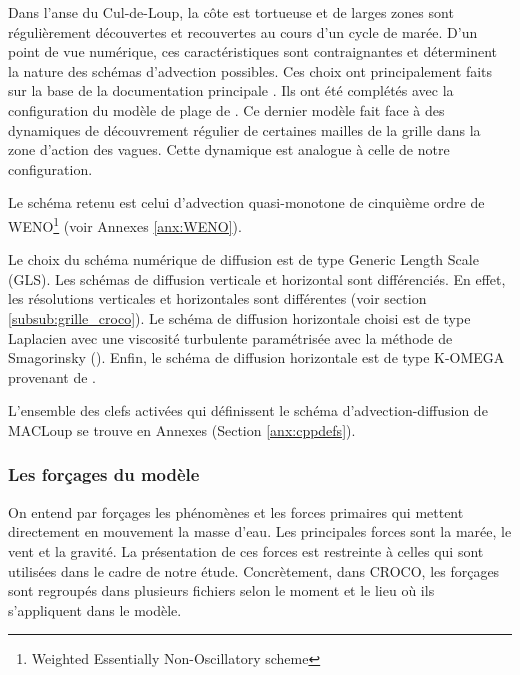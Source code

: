 \documentclass[10pt,a4paper,titlepage]{article}
\begin{document}
    Dans l'anse du Cul-de-Loup, la côte est tortueuse et de larges zones sont régulièrement découvertes et recouvertes au cours d'un cycle de marée.
    D'un point de vue numérique, ces caractéristiques sont contraignantes et déterminent la nature des schémas d'advection possibles.
    Ces choix ont principalement faits sur la base de la documentation principale \parencite{cppkeys_description}.
    Ils ont été complétés avec la configuration du modèle de plage de  \cite{swash_article_MARCHESIELLO2021101816}.
    Ce dernier modèle fait face à des dynamiques de découvrement régulier de certaines mailles de la grille dans la zone d'action des vagues.
    Cette dynamique est analogue à celle de notre configuration.
    
    Le schéma retenu est celui d'advection quasi-monotone de cinquième ordre de WENO\footnote{Weighted Essentially Non-Oscillatory scheme} (voir Annexes \ref{anx:WENO}).
    
    Le choix du schéma numérique de diffusion est de type Generic Length Scale (GLS).
    Les schémas de diffusion verticale et horizontal sont différenciés.
    En effet, les résolutions verticales et horizontales sont différentes (voir section \ref{subsub:grille_croco}).
    Le schéma de diffusion horizontale choisi est de type Laplacien avec une viscosité turbulente paramétrisée avec la méthode de Smagorinsky (\cite{schemas_diffusion_horizontale}).
    Enfin, le schéma de diffusion horizontale est de type K-OMEGA provenant de \cite{GLS_KOMEGA_kolmogorov1941equations}.
    
    L'ensemble des clefs activées qui définissent le schéma d'advection-diffusion de MACLoup se trouve en Annexes (Section \ref{anx:cppdefs}).
    
    
    \subsubsection{Les forçages du modèle}
    \label{subsub:forcages}
    On entend par forçages les phénomènes et les forces primaires qui mettent directement en mouvement la masse d'eau.
    Les principales forces sont la marée, le vent et la gravité.
    La présentation de ces forces est restreinte à celles qui sont utilisées dans le cadre de notre étude.
    Concrètement, dans CROCO, les forçages sont regroupés dans plusieurs fichiers selon le moment et le lieu où ils s'appliquent dans le modèle.
    
\end{document}
